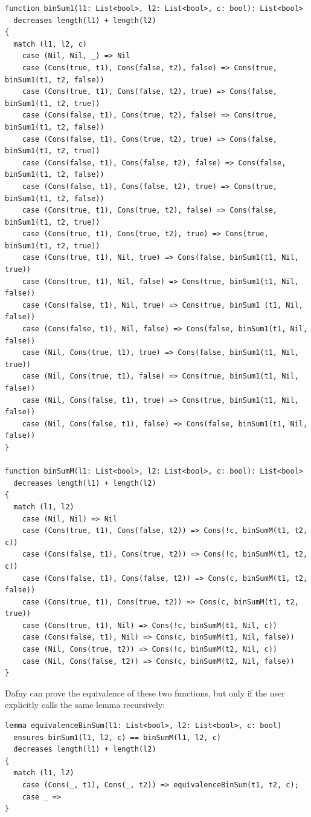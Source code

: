 \begin{verbatim}
function binSum1(l1: List<bool>, l2: List<bool>, c: bool): List<bool>
  decreases length(l1) + length(l2)
{
  match (l1, l2, c)
    case (Nil, Nil, _) => Nil
    case (Cons(true, t1), Cons(false, t2), false) => Cons(true, binSum1(t1, t2, false))
    case (Cons(true, t1), Cons(false, t2), true) => Cons(false, binSum1(t1, t2, true))
    case (Cons(false, t1), Cons(true, t2), false) => Cons(true, binSum1(t1, t2, false))
    case (Cons(false, t1), Cons(true, t2), true) => Cons(false, binSum1(t1, t2, true))
    case (Cons(false, t1), Cons(false, t2), false) => Cons(false, binSum1(t1, t2, false))
    case (Cons(false, t1), Cons(false, t2), true) => Cons(true, binSum1(t1, t2, false))
    case (Cons(true, t1), Cons(true, t2), false) => Cons(false, binSum1(t1, t2, true))
    case (Cons(true, t1), Cons(true, t2), true) => Cons(true, binSum1(t1, t2, true))
    case (Cons(true, t1), Nil, true) => Cons(false, binSum1(t1, Nil, true))
    case (Cons(true, t1), Nil, false) => Cons(true, binSum1(t1, Nil, false))
    case (Cons(false, t1), Nil, true) => Cons(true, binSum1 (t1, Nil, false))
    case (Cons(false, t1), Nil, false) => Cons(false, binSum1(t1, Nil, false))
    case (Nil, Cons(true, t1), true) => Cons(false, binSum1(t1, Nil, true))
    case (Nil, Cons(true, t1), false) => Cons(true, binSum1(t1, Nil, false))
    case (Nil, Cons(false, t1), true) => Cons(true, binSum1(t1, Nil, false))
    case (Nil, Cons(false, t1), false) => Cons(false, binSum1(t1, Nil, false))
}

function binSumM(l1: List<bool>, l2: List<bool>, c: bool): List<bool>
  decreases length(l1) + length(l2)
{
  match (l1, l2)
    case (Nil, Nil) => Nil
    case (Cons(true, t1), Cons(false, t2)) => Cons(!c, binSumM(t1, t2, c))
    case (Cons(false, t1), Cons(true, t2)) => Cons(!c, binSumM(t1, t2, c))
    case (Cons(false, t1), Cons(false, t2)) => Cons(c, binSumM(t1, t2, false))
    case (Cons(true, t1), Cons(true, t2)) => Cons(c, binSumM(t1, t2, true))
    case (Cons(true, t1), Nil) => Cons(!c, binSumM(t1, Nil, c))
    case (Cons(false, t1), Nil) => Cons(c, binSumM(t1, Nil, false))
    case (Nil, Cons(true, t2)) => Cons(!c, binSumM(t2, Nil, c))
    case (Nil, Cons(false, t2)) => Cons(c, binSumM(t2, Nil, false))
}
\end{verbatim}
%

Dafny can prove the equivalence of these two functions, but only if the user explicitly calls the same lemma recursively:
\begin{verbatim}
lemma equivalenceBinSum(l1: List<bool>, l2: List<bool>, c: bool)
  ensures binSum1(l1, l2, c) == binSumM(l1, l2, c)
  decreases length(l1) + length(l2)
{
  match (l1, l2)
    case (Cons(_, t1), Cons(_, t2)) => equivalenceBinSum(t1, t2, c);
    case _ => 
}
\end{verbatim}

